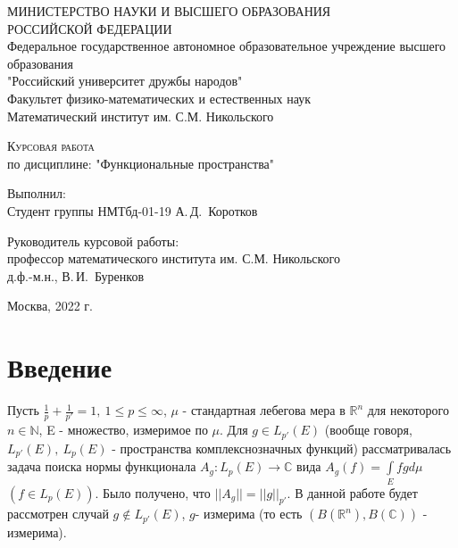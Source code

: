\documentclass[a4paper,14pt]{article}
\begin{document}
\begin{titlepage}
  \begin{center}
МИНИСТЕРСТВО НАУКИ И ВЫСШЕГО ОБРАЗОВАНИЯ\\
РОССИЙСКОЙ ФЕДЕРАЦИИ\\
    
Федеральное государственное автономное образовательное учреждение высшего образования\\
"Российский университет дружбы народов"\\
Факультет физико-математических и естественных наук\\
Математический институт им. С.М. Никольского
\vfill
 
\textsc{Курсовая работа}\\[5mm]
по дисциплине: "Функциональные пространства"\\
\end{center}
\vfill
 
\newlength{\ML}
\hfill\begin{minipage}{0.4\textwidth}
  Выполнил:\\
  Студент группы НМТбд-01-19
  А.\,Д.~Коротков\\
\end{minipage}

\hfill\begin{minipage}{0.4\textwidth}
  Руководитель курсовой работы:\\
  профессор математического института им. С.М. Никольского\\
  д.ф.-м.н.,
  В.\,И.~Буренков\\
\end{minipage}%
\bigskip
\vfill
 
\begin{center}
  Москва, 2022 г.
\end{center}
\end{titlepage}


\tableofcontents
\newpage
{}

\section{Введение}
Пусть $\frac{1}{p}+\frac{1}{p'}=1,\  1\leq p\leq \infty$, $\mu$ - стандартная лебегова мера в $\mathbb{R}^n$ для некоторого $n\in \mathbb{N}$, E - множество, измеримое по $\mu$. Для $g \in L_{p'}(E)$ (вообще говоря, $L_{p'}(E),\ L_{p}(E)$ - пространства комплекснозначных функций) рассматривалась задача поиска нормы функционала $A_g:L_p(E)\rightarrow \mathbb{C}$ вида
$A_g(f)=\int\limits_{E}fgd\mu$ $(f\in L_p(E))$. Было получено, что $||A_g||=||g||_{p'}$. В данной работе будет рассмотрен случай $g \not \in L_{p'}(E)$, $g$- измерима (то есть $(B(\mathbb{R}^n),B(\mathbb{C}))$ - измерима).
\end{document}
